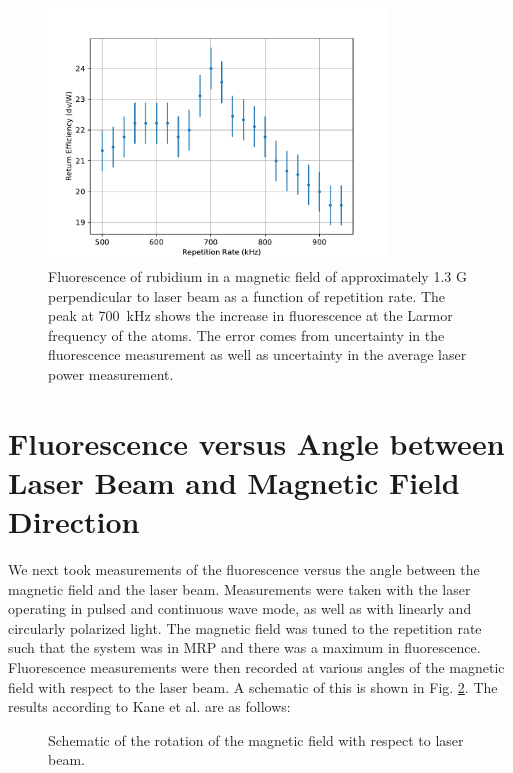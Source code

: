 \begin{figure}[ht]
	\centering
	\includegraphics[width=0.8\textwidth]{../../MRPData/MAR24/FLvRep.pdf}
	\caption{Fluorescence of rubidium in a magnetic field of approximately 1.3 G perpendicular to laser beam as a function of repetition rate. The peak at \SI{700}{ kHz} shows the increase in fluorescence at the Larmor frequency of the atoms. The error comes from uncertainty in the fluorescence measurement as well as uncertainty in the average laser power measurement.}
	\label{fig:flvrep}
\end{figure}


\section{Fluorescence versus Angle between Laser Beam and Magnetic Field Direction}
We next took measurements of the fluorescence versus the angle between the magnetic field and the laser beam. Measurements were taken with the laser operating in pulsed and continuous wave mode, as well as with linearly and circularly polarized light. The magnetic field was tuned to the repetition rate such that the system was in MRP and there was a maximum in fluorescence. Fluorescence measurements were then recorded at various angles of the magnetic field with respect to the laser beam. A schematic of this is shown in Fig. \ref{fig:flvanglesch}. The results according to Kane et al. \cite{Kane2014} are as follows:

\begin{figure}[htpb]
	\centering
	
	\caption{Schematic of the rotation of the magnetic field with respect to laser beam.}
	\label{fig:flvanglesch}
\end{figure}


